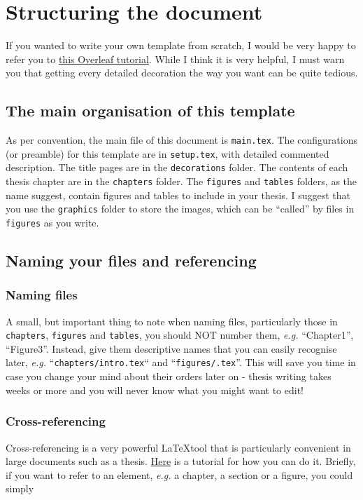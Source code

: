 \chapter{Structuring the document}

If you wanted to write your own template from scratch, I would be very happy to refer you to \href{https://www.overleaf.com/learn/latex/How_to_Write_a_Thesis_in_LaTeX_(Part_1)\%3A_Basic_Structure}{this Overleaf tutorial}. While I think it is very helpful, I must warn you that getting every detailed decoration the way you want can be quite tedious. 

\section{The main organisation of this template}
As per convention, the main file of this document is \texttt{main.tex}. The configurations (or preamble) for this template are in \texttt{setup.tex}, with detailed commented description. The title pages are in the \texttt{decorations} folder. The contents of each thesis chapter are in the \texttt{chapters} folder. The \texttt{figures} and \texttt{tables} folders, as the name suggest, contain figures and tables to include in your thesis. I suggest that you use the \texttt{graphics} folder to store the images, which can be ``called'' by files in \texttt{figures} as you write.

\section{Naming your files and referencing}

\subsection{Naming files}
A small, but important thing to note when naming files, particularly those in \texttt{chapters}, \texttt{figures} and \texttt{tables}, you should NOT number them, \textit{e.g.} ``Chapter1'', ``Figure3''. Instead, give them descriptive names that you can easily recognise later, \textit{e.g.} ``\texttt{chapters/intro.tex}`` and ``\texttt{figures/.tex}''. %
This will save you time in case you change your mind about their orders later on - thesis writing takes weeks or more and you will never know what you might want to edit!

\subsection{Cross-referencing}
Cross-referencing is a very powerful \LaTeX tool that is particularly convenient in large documents such as a thesis. \href{https://www.overleaf.com/learn/latex/Cross_referencing_sections\%2C_equations_and_floats}{Here} is a tutorial for how you can do it. Briefly, if you want to refer to an element, \textit{e.g.} a chapter, a section or a figure, you could simply 


